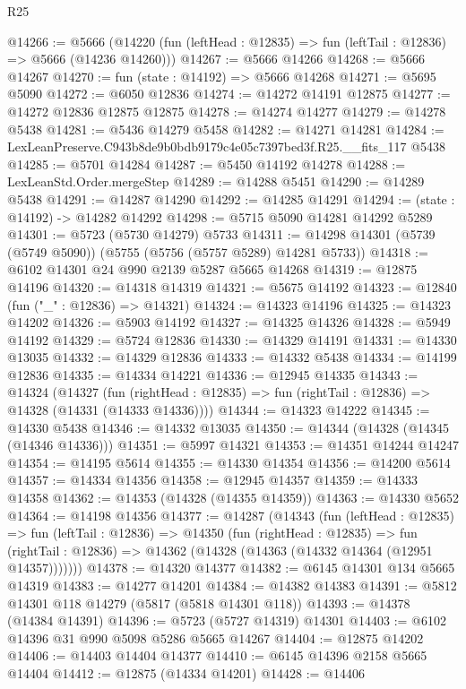 \begin{lexlean}{R25}
\begin{coremodule}
@14266 := @5666
    (@14220 (fun (leftHead : @12835) => fun (leftTail : @12836) => @5666 (@14236 @14260)))
@14267 := @5666 @14266
@14268 := @5666 @14267
@14270 := fun (state : @14192) => @5666 @14268
@14271 := @5695 @5090
@14272 := @6050 @12836
@14274 := @14272 @14191 @12875
@14277 := @14272 @12836 @12875 @12875
@14278 := @14274 @14277
@14279 := @14278 @5438
@14281 := @5436 @14279 @5458
@14282 := @14271 @14281
@14284 := LexLeanPreserve.C943b8de9b0bdb9179c4e05c7397bed3f.R25.__fits_117 @5438
@14285 := @5701 @14284
@14287 := @5450 @14192 @14278
@14288 := LexLeanStd.Order.mergeStep
@14289 := @14288 @5451
@14290 := @14289 @5438
@14291 := @14287 @14290
@14292 := @14285 @14291
@14294 := (state : @14192) -> @14282 @14292
@14298 := @5715 @5090 @14281 @14292 @5289
@14301 := @5723 (@5730 @14279) @5733
@14311 := @14298 @14301 (@5739 (@5749 @5090)) (@5755 (@5756 (@5757 @5289) @14281 @5733))
@14318 := @6102 @14301 @24 @990 @2139 @5287 @5665 @14268
@14319 := @12875 @14196
@14320 := @14318 @14319
@14321 := @5675 @14192
@14323 := @12840 (fun ("_" : @12836) => @14321)
@14324 := @14323 @14196
@14325 := @14323 @14202
@14326 := @5903 @14192
@14327 := @14325 @14326
@14328 := @5949 @14192
@14329 := @5724 @12836
@14330 := @14329 @14191
@14331 := @14330 @13035
@14332 := @14329 @12836
@14333 := @14332 @5438
@14334 := @14199 @12836
@14335 := @14334 @14221
@14336 := @12945 @14335
@14343 := @14324
    (@14327
      (fun (rightHead : @12835) => fun (rightTail : @12836) => @14328 (@14331 (@14333 @14336))))
@14344 := @14323 @14222
@14345 := @14330 @5438
@14346 := @14332 @13035
@14350 := @14344 (@14328 (@14345 (@14346 @14336)))
@14351 := @5997 @14321
@14353 := @14351 @14244 @14247
@14354 := @14195 @5614
@14355 := @14330 @14354
@14356 := @14200 @5614
@14357 := @14334 @14356
@14358 := @12945 @14357
@14359 := @14333 @14358
@14362 := @14353 (@14328 (@14355 @14359))
@14363 := @14330 @5652
@14364 := @14198 @14356
@14377 := @14287
    (@14343
      (fun (leftHead : @12835) =>
      fun (leftTail : @12836) =>
      @14350
        (fun (rightHead : @12835) =>
        fun (rightTail : @12836) => @14362 (@14328 (@14363 (@14332 @14364 (@12951 @14357)))))))
@14378 := @14320 @14377
@14382 := @6145 @14301 @134 @5665 @14319
@14383 := @14277 @14201
@14384 := @14382 @14383
@14391 := @5812 @14301 @118 @14279 (@5817 (@5818 @14301 @118))
@14393 := @14378 (@14384 @14391)
@14396 := @5723 (@5727 @14319) @14301
@14403 := @6102 @14396 @31 @990 @5098 @5286 @5665 @14267
@14404 := @12875 @14202
@14406 := @14403 @14404 @14377
@14410 := @6145 @14396 @2158 @5665 @14404
@14412 := @12875 (@14334 @14201)
@14428 := @14406

\end{coremodule}
\end{lexlean}
